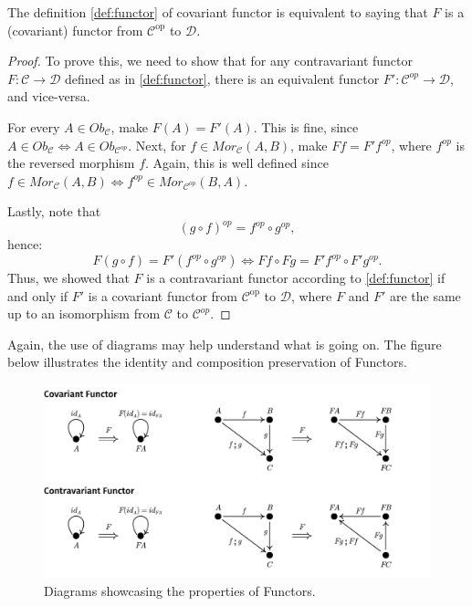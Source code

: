 \begin{lemma}
	The definition \ref{def:functor} of covariant functor is equivalent to
	saying that	$F$ is a (covariant) functor from $\mathcal C^{\text{op}}$ to $\mathcal D$.
	\label{lemma:contravariant}
\end{lemma}
\begin{proof}
	To prove this, we need to show that for any contravariant functor $F:\mathcal C \to \mathcal D$
	defined as in \ref{def:functor}, there is an equivalent functor $F':\mathcal C^{op}\to \mathcal D$,
	and vice-versa.

	For every $A \in Ob_\mathcal C$, make $F(A) = F'(A)$. This is fine, since
	$A \in Ob_\mathcal C \iff A \in Ob_{\mathcal C^{op}}$.
	Next, for $f \in Mor_\mathcal C (A,B)$, make
	$F f = F' f^{op}$, where $f^{op}$ is the reversed morphism $f$. Again, this is well defined since
	$f \in Mor_\mathcal C(A,B) \iff f^{op} \in Mor_{\mathcal C^{op}}(B,A)$.

	Lastly, note that
	\begin{displaymath}
		(g \circ f)^{op} = f^{op} \circ g^{op},
	\end{displaymath}
	hence:
	\begin{displaymath}
		F(g \circ f) = F'(f^{op}\circ g^{op})  \iff F f \circ F g  = F' f^{op} \circ F' g^{op}.
	\end{displaymath}
	Thus, we showed that $F$ is a contravariant functor according to \ref{def:functor}
	if and only if $F'$ is a covariant functor from $\mathcal C^{\text{op}}$ to $\mathcal D$, where
	$F$ and $F'$ are the same up to an isomorphism from $\mathcal C$ to $\mathcal C^{op}$.
\end{proof}

Again, the use of diagrams may help understand what is going on. The figure below
illustrates the identity and composition preservation of Functors.

\begin{figure}[H]
	\begin{center}
		\includegraphics[width=1.1\textwidth]{./notebooks/Functor.pdf}
	\end{center}
	\caption{Diagrams showcasing the properties of Functors.}
	\label{fig:Functor}
\end{figure}

